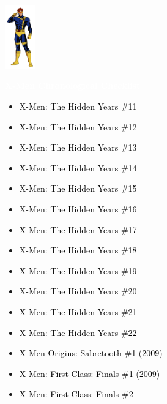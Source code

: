 \documentclass[12pt]{article}
\newcommand{\checkbox}{\raisebox{0.0ex}{\fbox{\rule{0ex}{1.5ex} \rule{1.5ex}{0ex}}}}
\begin{document}
\begin{center}
    \vspace*{2cm}
    \includegraphics[width=0.1\textwidth]{cyclops.png}
    \vspace{0.3cm}

    {\Huge \textbf{\textcolor{white}{X-Men Chronological Checklist}}}
\end{center}

\vspace{0.3cm}
\noindent
\begin{tcolorbox}[
  colback=white!95!gray,
  colframe=black,
  width=\textwidth,
  arc=4mm,
  auto outer arc,
  boxrule=0.8pt,
  left=8pt,right=8pt,top=8pt,bottom=8pt
]
\begin{itemize}[left=0pt,label={\checkbox}]
  \item \textcolor{black}{X-Men: The Hidden Years \#11}
  \item \textcolor{black}{X-Men: The Hidden Years \#12}
  \item \textcolor{black}{X-Men: The Hidden Years \#13}
  \item \textcolor{black}{X-Men: The Hidden Years \#14}
  \item \textcolor{black}{X-Men: The Hidden Years \#15}
  \item \textcolor{black}{X-Men: The Hidden Years \#16}
  \item \textcolor{black}{X-Men: The Hidden Years \#17}
  \item \textcolor{black}{X-Men: The Hidden Years \#18}
  \item \textcolor{black}{X-Men: The Hidden Years \#19}
  \item \textcolor{black}{X-Men: The Hidden Years \#20}
  \item \textcolor{black}{X-Men: The Hidden Years \#21}
  \item \textcolor{black}{X-Men: The Hidden Years \#22}
  \item \textcolor{black}{X-Men Origins: Sabretooth \#1 (2009)}
  \item \textcolor{black}{X-Men: First Class: Finals \#1 (2009)}
  \item \textcolor{black}{X-Men: First Class: Finals \#2}
\end{itemize}
\end{tcolorbox}
\end{document}
